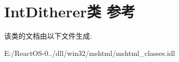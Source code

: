 \hypertarget{class_int_ditherer}{}\section{Int\+Ditherer类 参考}
\label{class_int_ditherer}


该类的文档由以下文件生成\+:\begin{DoxyCompactItemize}
\item 
E\+:/\+React\+O\+S-\/0../dll/win32/mshtml/mshtml\+\_\+classes.\+idl\end{DoxyCompactItemize}
